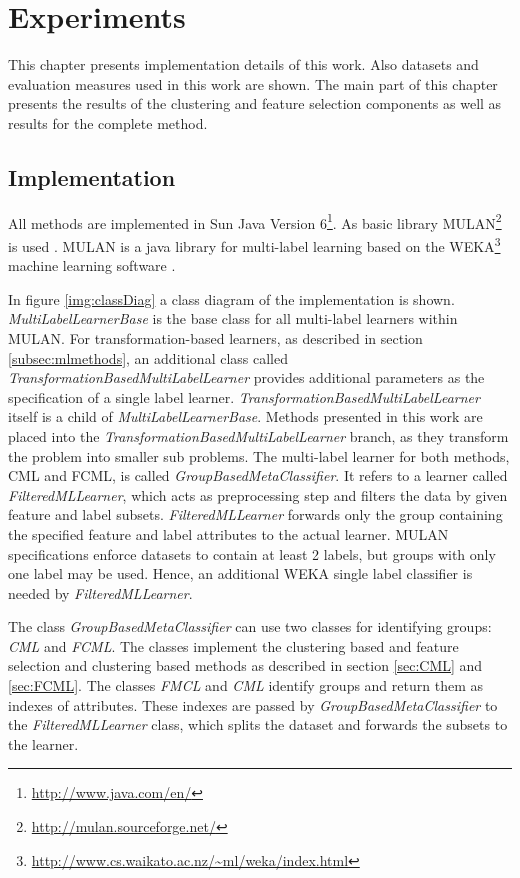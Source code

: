 \chapter{Experiments}
\label{chapter:Experiments}

	This chapter presents implementation details of this work. Also datasets and evaluation measures used in this work are shown. The main part of this chapter presents the results of the clustering and feature selection components as well as results for the complete method.

	\section{Implementation}
	\label{sec:implemenation}

		All methods are implemented in Sun Java Version 6\footnote{\url{http://www.java.com/en/}}. As basic library \mbox{MULAN}\footnote{\url{http://mulan.sourceforge.net/}} is used \cite{mulan}. \mbox{MULAN} is a java library for multi-label learning based on the WEKA\footnote{\url{http://www.cs.waikato.ac.nz/~ml/weka/index.html}} machine learning software \cite{weka}.

		In figure \ref{img:classDiag} a class diagram of the implementation is shown. \textit{MultiLabelLearnerBase} is the base class for all multi-label learners within \mbox{MULAN}. For transformation-based learners, as described in section \ref{subsec:mlmethods}, an additional class called \textit{TransformationBasedMultiLabelLearner} provides additional parameters as the specification of a single label learner. \textit{TransformationBasedMultiLabelLearner} itself is a child of \textit{MultiLabelLearnerBase}. Methods presented in this work are placed into the \textit{TransformationBasedMultiLabelLearner} branch, as they transform the problem into smaller sub problems. The multi-label learner for both methods, CML and FCML, is called \textit{GroupBasedMetaClassifier}. It refers to a learner called \textit{FilteredMLLearner}, which acts as preprocessing step and filters the data by given feature and label subsets. \textit{FilteredMLLearner} forwards only the group containing the specified feature and label attributes to the actual learner. \mbox{MULAN} specifications enforce datasets to contain at least 2 labels, but groups with only one label may be used. Hence, an additional WEKA single label classifier is needed by \textit{FilteredMLLearner}.

		The class \textit{GroupBasedMetaClassifier} can use two classes for identifying groups: \textit{CML} and  \textit{FCML}. The classes implement the clustering based and feature selection and clustering based methods as described in section \ref{sec:CML} and \ref{sec:FCML}. The classes \textit{FMCL} and \textit{CML} identify groups and return them as indexes of attributes. These indexes are passed by \textit{GroupBasedMetaClassifier} to the \textit{FilteredMLLearner} class, which splits the dataset and forwards the subsets to the learner.

